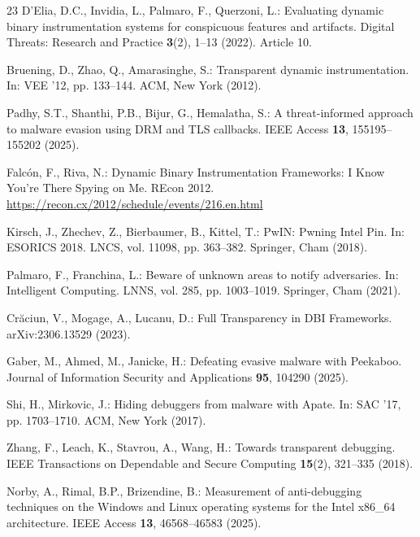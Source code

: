 \documentclass[pdflatex,sn-mathphys-num]{sn-jnl}
\theoremstyle{thmstyleone}
\theoremstyle{thmstyletwo}
\theoremstyle{thmstylethree}
\begin{document}
\begin{thebibliography}{23}
D'Elia, D.C., Invidia, L., Palmaro, F., Querzoni, L.:
Evaluating dynamic binary instrumentation systems for conspicuous features and artifacts.
Digital Threats: Research and Practice \textbf{3}(2), 1--13 (2022). Article 10.

Bruening, D., Zhao, Q., Amarasinghe, S.:
Transparent dynamic instrumentation.
In: VEE '12, pp. 133--144. ACM, New York (2012).

Padhy, S.T., Shanthi, P.B., Bijur, G., Hemalatha, S.:
A threat-informed approach to malware evasion using DRM and TLS callbacks.
IEEE Access \textbf{13}, 155195--155202 (2025).

Falc\'{o}n, F., Riva, N.:
Dynamic Binary Instrumentation Frameworks: I Know You're There Spying on Me.
REcon 2012. \url{https://recon.cx/2012/schedule/events/216.en.html}

Kirsch, J., Zhechev, Z., Bierbaumer, B., Kittel, T.:
PwIN: Pwning Intel Pin.
In: ESORICS 2018. LNCS, vol. 11098, pp. 363--382. Springer, Cham (2018).

Palmaro, F., Franchina, L.:
Beware of unknown areas to notify adversaries.
In: Intelligent Computing. LNNS, vol. 285, pp. 1003--1019. Springer, Cham (2021).

Cr\u{a}ciun, V., Mogage, A., Lucanu, D.:
Full Transparency in DBI Frameworks.
arXiv:2306.13529 (2023).

Gaber, M., Ahmed, M., Janicke, H.:
Defeating evasive malware with Peekaboo.
Journal of Information Security and Applications \textbf{95}, 104290 (2025).

Shi, H., Mirkovic, J.:
Hiding debuggers from malware with Apate.
In: SAC '17, pp. 1703--1710. ACM, New York (2017).

Zhang, F., Leach, K., Stavrou, A., Wang, H.:
Towards transparent debugging.
IEEE Transactions on Dependable and Secure Computing \textbf{15}(2), 321--335 (2018).

Norby, A., Rimal, B.P., Brizendine, B.:
Measurement of anti-debugging techniques on the Windows and Linux operating systems for the Intel x86\_64 architecture.
IEEE Access \textbf{13}, 46568--46583 (2025).


\end{thebibliography}
\end{document}

